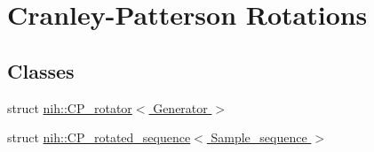 \hypertarget{group__cp__rotations}{
\section{\-Cranley-\/\-Patterson \-Rotations}
\label{group__cp__rotations}
}
\subsection*{\-Classes}
\begin{DoxyCompactItemize}
\item 
struct \hyperlink{structnih_1_1_c_p__rotator}{nih\-::\-C\-P\-\_\-rotator$<$ Generator $>$}
\item 
struct \hyperlink{structnih_1_1_c_p__rotated__sequence}{nih\-::\-C\-P\-\_\-rotated\-\_\-sequence$<$ Sample\-\_\-sequence $>$}
\end{DoxyCompactItemize}
